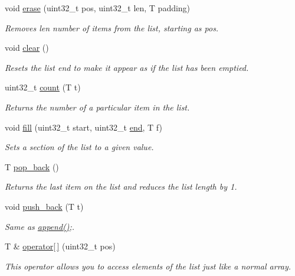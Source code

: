 \begin{DoxyCompactItemize}
void \hyperlink{classetk_1_1_list_a78809d6a543ff0c25fdb26ec892cad39}{erase} (uint32\-\_\-t pos, uint32\-\_\-t len, T padding)
\begin{DoxyCompactList}\small\item\em Removes len number of items from the list, starting as pos. \end{DoxyCompactList}\item 
void \hyperlink{classetk_1_1_list_a429128ca6b0d5f9e97fdfd52b0190364}{clear} ()
\begin{DoxyCompactList}\small\item\em Resets the list end to make it appear as if the list has been emptied. \end{DoxyCompactList}\item 
uint32\-\_\-t \hyperlink{classetk_1_1_list_aa7998b544ad4dd4a53537f09d8895597}{count} (T t)
\begin{DoxyCompactList}\small\item\em Returns the number of a particular item in the list. \end{DoxyCompactList}\item 
void \hyperlink{classetk_1_1_list_a09630e32f01e3eb094b0172239416961}{fill} (uint32\-\_\-t start, uint32\-\_\-t \hyperlink{classetk_1_1_list_a19b25cd89872debc07cc002c18845578}{end}, T f)
\begin{DoxyCompactList}\small\item\em Sets a section of the list to a given value. \end{DoxyCompactList}\item 
T \hyperlink{classetk_1_1_list_a85741b89a92238cce95b940ce8a5554e}{pop\-\_\-back} ()
\begin{DoxyCompactList}\small\item\em Returns the last item on the list and reduces the list length by 1. \end{DoxyCompactList}\item 
void \hyperlink{classetk_1_1_list_ab7dc844f7e80ac5ea9e7a8923230385a}{push\-\_\-back} (T t)
\begin{DoxyCompactList}\small\item\em Same as \hyperlink{classetk_1_1_list_a45df48bc3bb87c2dd26e56f51115ab27}{append()};. \end{DoxyCompactList}\item 
T \& \hyperlink{classetk_1_1_list_a932520c2f8f21ab343d4f1f90345ebc4}{operator\mbox{[}$\,$\mbox{]}} (uint32\-\_\-t pos)
\begin{DoxyCompactList}\small\item\em This operator allows you to access elements of the list just like a normal array. \end{DoxyCompactList}\item 

\end{DoxyCompactItemize}
